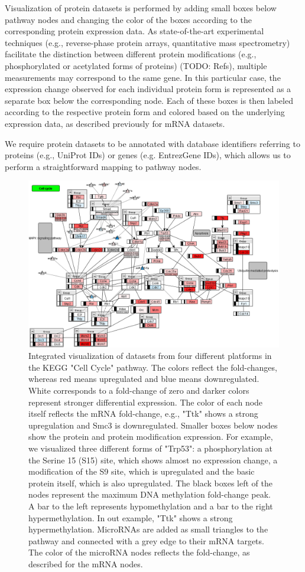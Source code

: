 \documentclass{bioinfo}
\begin{document}
Visualization of protein datasets is performed by adding small boxes below pathway nodes and
changing the color of the boxes according to the corresponding protein expression data. As state-of-the-art
experimental techniques (e.g., reverse-phase protein arrays, quantitative mass spectrometry)
facilitate the distinction between different protein modifications (e.g., phosphorylated or
acetylated forms of proteins) (TODO: Refs), multiple measurements may correspond to the same gene.
In this particular case, the expression change observed for each individual protein form is represented
as a separate box below the corresponding node. Each of these boxes is then labeled according to the
respective protein form and colored based on the underlying expression data, as described previously
for mRNA datasets.

We require protein datasets to be annotated with database identifiers referring to proteins (e.g.,
UniProt IDs) or genes (e.g. EntrezGene IDs), which allows us to perform a straightforward mapping to
pathway nodes.


\begin{figure}
\centering
\includegraphics[width=.70\textwidth]{figures/mmu04110.png}
\caption{
Integrated visualization of datasets from four different platforms in the KEGG "Cell Cycle" pathway.
The colors reflect the fold-changes, whereas red means upregulated and blue means downregulated. White corresponds to a fold-change of zero and darker colors represent stronger differential expression. The color of each node itself reflects the mRNA fold-change, e.g., "Ttk" shows a strong upregulation and Smc3 is downregulated. Smaller boxes below nodes show the protein and protein modification expression. For example, we visualized three different forms of "Trp53": a phosphorylation at the Serine 15 (S15) site, which shows almost no expression change, a modification of the S9 site, which is upregulated and the basic protein itself, which is also upregulated.
The black boxes left of the nodes represent the maximum DNA methylation fold-change peak. A bar to the left represents hypomethylation and a bar to the right hypermethylation. In out example, "Ttk" shows a strong hypermethylation. MicroRNAs are added as small triangles to the pathway and connected with a grey edge to their mRNA targets. The color of the microRNA nodes reflects the fold-change, as described for the mRNA nodes.}\label{fig:cellcycle}
\end{figure}
\end{document}
